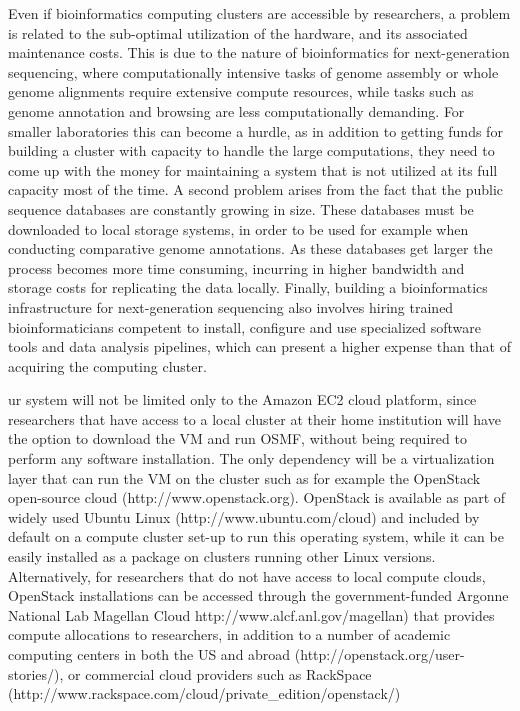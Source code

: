 \documentclass[10pt]{bmc_article}
\newenvironment{bmcformat}{\begin{raggedright}\baselineskip20pt\sloppy\setboolean{publ}{false}}{\end{raggedright}\baselineskip20pt\sloppy}
\begin{document}
\begin{bmcformat}
      Even if bioinformatics computing clusters are accessible by researchers, a problem
      is related to the sub-optimal utilization of the hardware, and its associated
      maintenance costs. This is due to the nature of bioinformatics for next-generation
      sequencing, where computationally intensive tasks of genome assembly or whole genome
      alignments require extensive compute resources, while tasks such as genome
      annotation and browsing are less computationally demanding. For smaller laboratories
      this can become a hurdle, as in addition to getting funds for building a cluster
      with capacity to handle the large computations, they need to come up with the money
      for maintaining a system that is not utilized at its full capacity most of the time.
      A second problem arises from the fact that  the public sequence databases are
      constantly growing in size. These databases must be downloaded to local storage
      systems, in order to be used for example when conducting comparative genome
      annotations. As these databases get larger the process becomes more time consuming,
      incurring in higher bandwidth and storage costs for replicating the data locally.
      Finally, building a bioinformatics infrastructure for next-generation sequencing
      also involves hiring trained bioinformaticians competent to install, configure and
      use specialized software tools and data analysis pipelines, which can present a
      higher expense than that of acquiring the computing cluster.

      ur system will not be limited only to the Amazon EC2 cloud platform, since researchers
      that have access to a local cluster at their home institution will have the option to
      download the VM and run OSMF, without being required to perform any software installation.
      The only dependency will be a virtualization layer that can run the VM on the cluster such
      as for example the OpenStack open-source cloud (http://www.openstack.org). OpenStack is
      available as part of widely used Ubuntu Linux (http://www.ubuntu.com/cloud) and included
      by default on a compute cluster set-up to run this operating system, while it can be
      easily installed as a package on clusters running other Linux versions. Alternatively, for
      researchers that do not have access to local compute clouds, OpenStack installations can
      be accessed through the government-funded Argonne National Lab Magellan Cloud
      http://www.alcf.anl.gov/magellan) that provides compute allocations to researchers, in
      addition to a number of academic computing centers in both the US and abroad
      (http://openstack.org/user-stories/), or commercial cloud providers such as RackSpace
      (http://www.rackspace.com/cloud/private_edition/openstack/)



\end{bmcformat}
\end{document}
